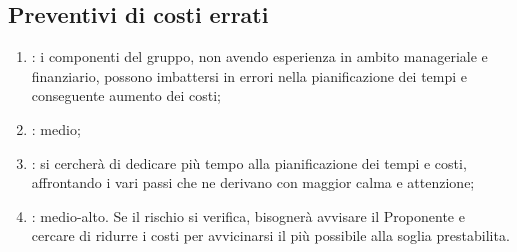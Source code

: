 \subsection{Preventivi di costi errati}
\begin{enumerate}
\item {}: i componenti del gruppo, non avendo esperienza in ambito manageriale e finanziario, possono imbattersi in errori nella pianificazione dei tempi e conseguente aumento dei costi;
\item {}: medio;
\item {}: si cercherà di dedicare più tempo alla pianificazione dei tempi e costi, affrontando i vari passi che ne derivano con maggior calma e attenzione;
\item {}: medio-alto. Se il rischio si verifica, bisognerà avvisare il Proponente e cercare di ridurre i costi per avvicinarsi il più possibile alla soglia prestabilita.
\end{enumerate}
